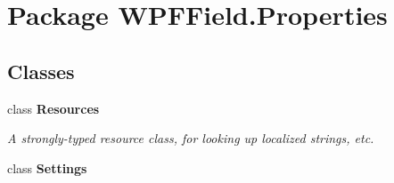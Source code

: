 \hypertarget{namespace_w_p_f_field_1_1_properties}{\section{Package W\-P\-F\-Field.\-Properties}
\label{namespace_w_p_f_field_1_1_properties}
}
\subsection*{Classes}
\begin{DoxyCompactItemize}
\item 
class {\bfseries Resources}
\begin{DoxyCompactList}\small\item\em A strongly-\/typed resource class, for looking up localized strings, etc. \end{DoxyCompactList}\item 
class {\bfseries Settings}
\end{DoxyCompactItemize}
